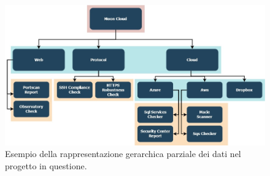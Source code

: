 \begin{figure}[ht!]
    \centering
    \includegraphics[scale=0.58]{images/MC_Rec_Tree.jpg}
    \caption[Rappresentazione gerarchica di dati relativi al progetto]{Esempio della rappresentazione gerarchica parziale dei dati nel progetto in questione.}
    \label{fig:MC_Rec_Tree}
\end{figure}
%
\newpage
%
